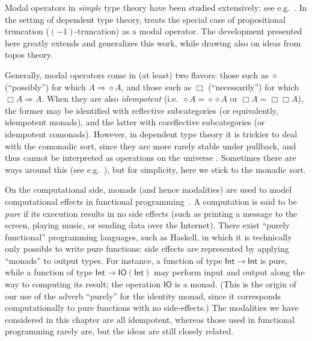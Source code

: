 Modal operators in \emph{simple} type theory have been studied extensively; see e.g.~\cite{modalTT}.  In the setting of dependent type theory, \cite{ab:bracket-types} treats the special case of propositional truncation ($(-1)$-truncation) as a modal operator.  The development presented here greatly extends and generalizes this work, while drawing also on ideas from topos theory.

Generally, modal operators come in (at least) two flavors: those such as $\diamond$ (``possibly'') for which $A\Rightarrow \diamond A$, and those such as $\Box$ (``necessarily'') for which $\Box A \Rightarrow A$.
When they are also \emph{idempotent} (i.e.\ $\diamond A = \diamond{\diamond A}$ or $\Box A = \Box{\Box A}$), the former may be identified with reflective subcategories (or equivalently, idempotent monads), and the latter with coreflective subcategories (or idempotent comonads).
However, in dependent type theory it is trickier to deal with the comonadic sort, since they are more rarely stable under pullback, and thus cannot be interpreted as operations on the universe \UU.
Sometimes there are ways around this (see e.g.~\cite{QGFTinCHoTT12}), but for simplicity, here we stick to the monadic sort.

On the computational side, monads (and hence modalities) are used to model computational effects in functional programming~\cite{Moggi89}.%
%
%
A computation is said to be \emph{pure} if its execution results in no side effects (such as printing a message to the screen, playing music, or sending data over the Internet).
There exist ``purely functional'' programming languages, such as Haskell, in which it is technically only possible to write pure functions: side effects are represented by applying ``monads'' to output types.
For instance, a function of type $\mathsf{Int}\to\mathsf{Int}$ is pure, while a function of type $\mathsf{Int}\to \mathsf{IO}(\mathsf{Int})$ may perform input and output along the way to computing its result; the operation $\mathsf{IO}$ is a monad.
%
(This is the origin of our use of the adverb ``purely'' for the identity monad, since it corresponds computationally to pure functions with no side-effects.)
The modalities we have considered in this chapter are all idempotent, whereas those used in functional programming rarely are, but the ideas are still closely related.


